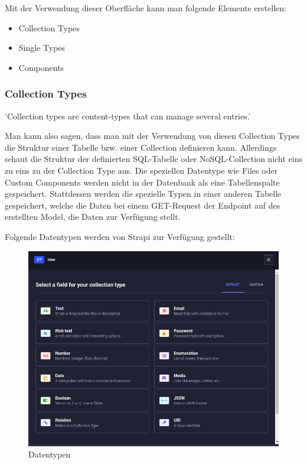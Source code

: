 Mit der Verwendung dieser Oberfläche kann man folgende Elemente erstellen:
\begin{itemize}
    \item Collection Types
    \item Single Types
    \item Components
\end{itemize}

\subsubsection{Collection Types}

'Collection types are content-types that can manage several entries.'
\cite{collection-types}

Man kann also sagen, dass man mit der Verwendung von diesen Collection Types die Struktur einer Tabelle bzw. einer Collection definieren kann.
Allerdings schaut die Struktur der definierten SQL-Tabelle oder NoSQL-Collection nicht eins zu eins zu der Collection Type aus.
Die speziellen Datentype wie Files oder Custom Components werden nicht in der Datenbank als eine Tabellenspalte gespeichert.
Stattdessen werden die spezielle Typen in einer anderen Tabelle gespeichert, welche die Daten bei einem GET-Request der Endpoint  auf des erstellten Model, die Daten zur Verfügung stellt.

Folgende Datentypen  werden von Strapi zur Verfügung gestellt:

\begin{figure}[H]
    \centering
    \includegraphics[width=\textwidth]{./pics/datatypes}
    \caption{Datentypen}
    \label{datatypes}
\end{figure}

